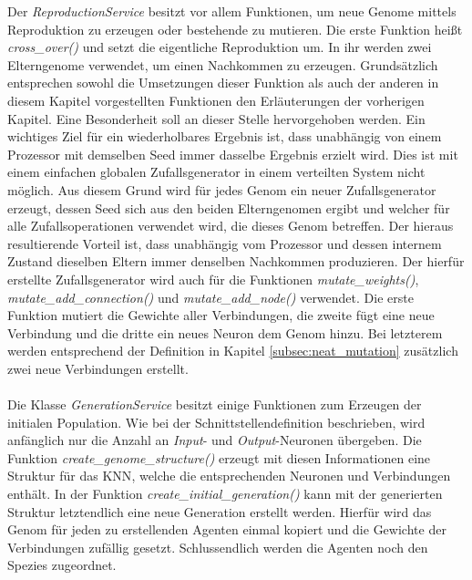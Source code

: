 Der \emph{ReproductionService} besitzt vor allem Funktionen, um neue Genome mittels Reproduktion zu erzeugen oder bestehende zu mutieren. Die erste Funktion heißt \emph{cross\_over()} und setzt die eigentliche Reproduktion um. In ihr werden zwei Elterngenome verwendet, um einen Nachkommen zu erzeugen. Grundsätzlich entsprechen sowohl die Umsetzungen dieser Funktion als auch der anderen in diesem Kapitel vorgestellten Funktionen den Erläuterungen der vorherigen Kapitel. Eine Besonderheit soll an dieser Stelle hervorgehoben werden. Ein wichtiges Ziel für ein wiederholbares Ergebnis ist, dass unabhängig von einem Prozessor mit demselben Seed immer dasselbe Ergebnis erzielt wird. Dies ist mit einem einfachen globalen Zufallsgenerator in einem verteilten System nicht möglich. Aus diesem Grund wird für jedes Genom ein neuer Zufallsgenerator erzeugt, dessen Seed sich aus den beiden Elterngenomen ergibt und welcher für alle Zufallsoperationen verwendet wird, die dieses Genom betreffen. Der hieraus resultierende Vorteil ist, dass unabhängig vom Prozessor und dessen internem Zustand dieselben Eltern immer denselben Nachkommen produzieren. Der hierfür erstellte Zufallsgenerator wird auch für die Funktionen \emph{mutate\_weights()}, \emph{mutate\_add\_connection()} und \emph{mutate\_add\_node()} verwendet. Die erste Funktion mutiert die Gewichte aller Verbindungen, die zweite fügt eine neue Verbindung und die dritte ein neues Neuron dem Genom hinzu. Bei letzterem werden entsprechend der Definition in Kapitel \ref{subsec:neat_mutation} zusätzlich zwei neue Verbindungen erstellt.
\\\\
Die Klasse \emph{GenerationService} besitzt einige Funktionen zum Erzeugen der initialen Population. Wie bei der Schnittstellendefinition beschrieben, wird anfänglich nur die Anzahl an \emph{Input}- und \emph{Output}-Neuronen übergeben. Die Funktion \emph{create\_genome\_structure()} erzeugt mit diesen Informationen eine Struktur für das \ac{KNN}, welche die entsprechenden Neuronen und Verbindungen enthält. In der Funktion \emph{create\_initial\_generation()} kann mit der generierten Struktur letztendlich eine neue Generation erstellt werden. Hierfür wird das Genom für jeden zu erstellenden Agenten einmal kopiert und die Gewichte der Verbindungen zufällig gesetzt. Schlussendlich werden die Agenten noch den Spezies zugeordnet.
\\\\

